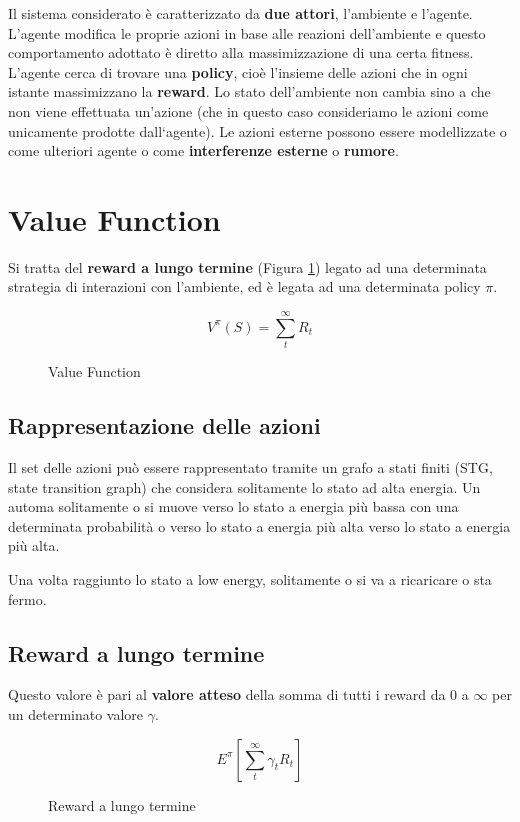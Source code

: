 \documentclass[\main/main.tex]{subfiles}
\begin{document}
Il sistema considerato è caratterizzato da \textbf{due attori}, l'ambiente e l'agente. L'agente modifica le proprie azioni in base alle reazioni dell'ambiente e questo comportamento adottato è diretto alla massimizzazione di una certa fitness. L'agente cerca di trovare una \textbf{policy}, cioè l'insieme delle azioni che in ogni istante massimizzano la \textbf{reward}. Lo stato dell'ambiente non cambia sino a che non viene effettuata un'azione (che in questo caso consideriamo le azioni come unicamente prodotte dall`agente). Le azioni esterne possono essere modellizzate o come ulteriori agente o come \textbf{interferenze esterne} o \textbf{rumore}.

\section{Value Function}
Si tratta del \textbf{reward a lungo termine} (Figura \ref{formula:value_function}) legato ad una determinata strategia di interazioni con l'ambiente, ed è legata ad una determinata policy $\pi$.

\begin{figure}
  \[
    V^\pi (S) = \sum_t^\infty R_t
  \]
  \caption{Value Function}
  \label{formula:value_function}
\end{figure}

\subsection{Rappresentazione delle azioni}
Il set delle azioni può essere rappresentato tramite un grafo a stati finiti (STG, state transition graph) che considera solitamente lo stato ad alta energia. Un automa solitamente o si muove verso lo stato a energia più bassa con una determinata probabilità o verso lo stato a energia più alta verso lo stato a energia più alta.

Una volta raggiunto lo stato a low energy, solitamente o si va a ricaricare o sta fermo.

\subsection{Reward a lungo termine}
Questo valore è pari al \textbf{valore atteso} della somma di tutti i reward da $0$ a $\infty$ per un determinato valore $\gamma$.
\begin{figure}
  \[
    E^\pi \left[ \sum_t^\infty \gamma_t R_t \right]
  \]
  \caption{Reward a lungo termine}
\end{figure}
\end{document}
